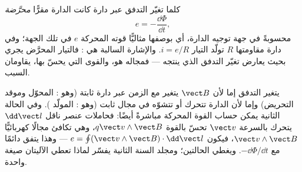 \begin{theorem}\label{thm:b1:induction:faraday}
كلما تغيّر التدفق عبر دارة كانت الدارة مقرًّا
\emph{ محرَّضة}
\[
e = -\frac{\dd\Phi}{\dd t} ,
\]
محسوبةً في جهة توجيه الدارة، أي بوصفها 
مثاليًّا قوته المحركة $e$ في تلك الجهة؛ وفي دارة مقاومتها $R$
تولّد التيار $i = e/R$. والإشارة السالبة هي \emph{}:
فالتيار المحرَّض يجري بحيث يعارض تغيّر التدفق الذي
ينتجه --- فمجاله هو، والقوى التي يحسّ بها، يقاومان السبب.
\end{theorem}
\admitted

\begin{remark}\label{rem:b1:induction:twofaces}
يتغير التدفق إما لأن $\vect B$ يتغير مع الزمن عبر دارة
ثابتة (وهو \emph{}: المحوّل وموقد التحريض)
وإما لأن الدارة تتحرك أو تتشوّه في مجال ثابت
(وهو \emph{}: المولّد ). وفي الحالة الثانية
يمكن حساب القوة المحركة مباشرةً أيضًا: فحاملات عنصر ناقل
$\dd\vect l$ يتحرك بالسرعة $\vect v$ تحسّ بالقوة $q\vect v\wedge
\vect B$، وهي تكافئ مجالًا كهربائيًّا $\vect v\wedge\vect B$، فيكون
$e = \oint(\vect v\wedge\vect B)\cdot\dd\vect l$ --- وهذا يتفق دائمًا
مع $-\dd\Phi/\dd t$. ويغطي  الحالتين؛ ومجلد السنة الثانية
يفسّر لماذا تعطي الآليتان صيغة واحدة.
\end{remark}

